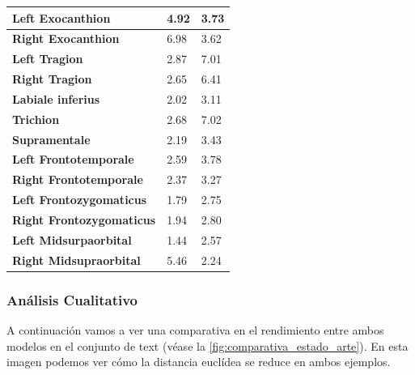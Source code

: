 \begin{table}[!ht]
\begin{tabular}{|l|l|l|}
                    \textbf{Left Exocanthion} & 4.92 & \cellcolor{green!25}3.73 \\ \hline
                    \textbf{Right Exocanthion} & 6.98 & \cellcolor{green!25}3.62 \\ \hline
                    \textbf{Left Tragion} & \cellcolor{green!25}2.87 & 7.01 \\ \hline
                    \textbf{Right Tragion} & \cellcolor{green!25}2.65 & 6.41 \\ \hline
                    \textbf{Labiale inferius} & \cellcolor{green!25}2.02 & 3.11 \\ \hline
                    \textbf{Trichion} & \cellcolor{green!25}2.68 & 7.02 \\ \hline
                    \textbf{Supramentale} & \cellcolor{green!25}2.19 & 3.43 \\ \hline
                    \textbf{Left Frontotemporale} & \cellcolor{green!25}2.59 & 3.78 \\ \hline
                    \textbf{Right Frontotemporale} & \cellcolor{green!25}2.37 & 3.27 \\ \hline
                    \textbf{Left Frontozygomaticus} & \cellcolor{green!25}1.79 & 2.75 \\ \hline
                    \textbf{Right Frontozygomaticus} & \cellcolor{green!25}1.94 & 2.80 \\ \hline
                    \textbf{Left Midsurpaorbital} & \cellcolor{green!25}1.44 & 2.57 \\ \hline
                    \textbf{Right Midsupraorbital} & 5.46 & \cellcolor{green!25}2.24 \\ \hline
                \end{tabular}
                \label{table:comparativa-Landmarks}
            \end{table}

            \medskip
            \newpage

            \subsubsection*{Análisis Cualitativo}

            \noindent A continuación vamos a ver una comparativa en el rendimiento entre ambos modelos en el conjunto de text (véase la \autoref{fig:comparativa_estado_arte}). En esta imagen podemos ver cómo la distancia euclídea se reduce en ambos ejemplos. 
            
